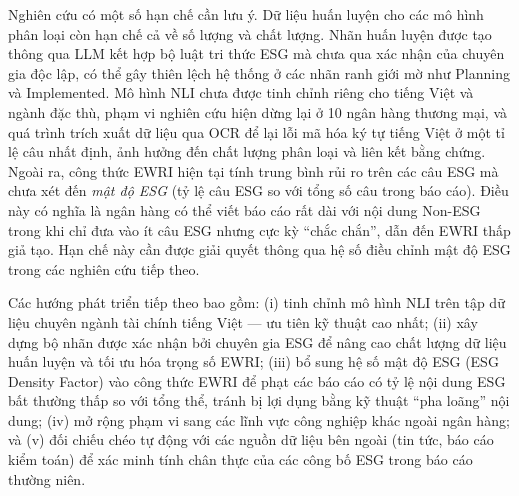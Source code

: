 Nghiên cứu có một số hạn chế cần lưu ý. Dữ liệu huấn luyện cho các mô hình phân loại còn hạn chế cả về số lượng và chất lượng. Nhãn huấn luyện được tạo thông qua LLM kết hợp bộ luật tri thức ESG mà chưa qua xác nhận của chuyên gia độc lập, có thể gây thiên lệch hệ thống ở các nhãn ranh giới mờ như Planning và Implemented. Mô hình NLI chưa được tinh chỉnh riêng cho tiếng Việt và ngành đặc thù, phạm vi nghiên cứu hiện dừng lại ở 10 ngân hàng thương mại, và quá trình trích xuất dữ liệu qua OCR để lại lỗi mã hóa ký tự tiếng Việt ở một tỉ lệ câu nhất định, ảnh hưởng đến chất lượng phân loại và liên kết bằng chứng. Ngoài ra, công thức EWRI hiện tại tính trung bình rủi ro trên các câu ESG mà chưa xét đến \textit{mật độ ESG} (tỷ lệ câu ESG so với tổng số câu trong báo cáo). Điều này có nghĩa là ngân hàng có thể viết báo cáo rất dài với nội dung Non-ESG trong khi chỉ đưa vào ít câu ESG nhưng cực kỳ ``chắc chắn'', dẫn đến EWRI thấp giả tạo. Hạn chế này cần được giải quyết thông qua hệ số điều chỉnh mật độ ESG trong các nghiên cứu tiếp theo.

Các hướng phát triển tiếp theo bao gồm: (i) tinh chỉnh mô hình NLI trên tập dữ liệu chuyên ngành tài chính tiếng Việt --- ưu tiên kỹ thuật cao nhất; (ii) xây dựng bộ nhãn được xác nhận bởi chuyên gia ESG để nâng cao chất lượng dữ liệu huấn luyện và tối ưu hóa trọng số EWRI; (iii) bổ sung hệ số mật độ ESG (ESG Density Factor) vào công thức EWRI để phạt các báo cáo có tỷ lệ nội dung ESG bất thường thấp so với tổng thể, tránh bị lợi dụng bằng kỹ thuật ``pha loãng'' nội dung; (iv) mở rộng phạm vi sang các lĩnh vực công nghiệp khác ngoài ngân hàng; và (v) đối chiếu chéo tự động với các nguồn dữ liệu bên ngoài (tin tức, báo cáo kiểm toán) để xác minh tính chân thực của các công bố ESG trong báo cáo thường niên.


\cleardoublepage
